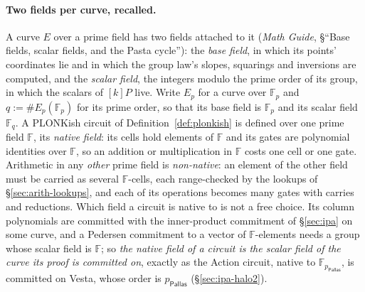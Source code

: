 \documentclass[11pt,a4paper]{article}
\theoremstyle{definition}
\newcommand{\F}{\mathbb{F}}
\newcommand{\Pallas}{\ensuremath{\mathsf{Pallas}}}
\begin{document}
\paragraph{Two fields per curve, recalled.}
A curve $E$ over a prime field has two fields attached to it
(\emph{Math Guide}, \S``Base fields, scalar fields, and the Pasta
cycle''): the \emph{base field}, in which its points' coordinates lie
and in which the group law's slopes, squarings and inversions are
computed, and the \emph{scalar field}, the integers modulo the prime
order of its group, in which the scalars of $[k]P$ live. Write $E_p$
for a curve over $\F_p$ and $q := \#E_p(\F_p)$ for its prime order, so
that its base field is $\F_p$ and its scalar field $\F_q$. A PLONKish
circuit of Definition~\ref{def:plonkish} is defined over one prime
field $\F$, its \emph{native field}: its cells hold elements of $\F$
and its gates are polynomial identities over $\F$, so an addition or
multiplication in $\F$ costs one cell or one gate. Arithmetic in any
\emph{other} prime field is \emph{non-native}: an element of the other
field must be carried as several $\F$-cells, each range-checked by the
lookups of \S\ref{sec:arith-lookups}, and each of its operations
becomes many gates with carries and reductions. Which field a
circuit is native to is not a free choice. Its column polynomials are
committed with the inner-product commitment of \S\ref{sec:ipa} on some
curve, and a Pedersen commitment to a vector of $\F$-elements needs a
group whose scalar field is $\F$; so \emph{the native field of a
circuit is the scalar field of the curve its proof is committed on},
exactly as the Action circuit, native to $\F_{p_{\Pallas}}$, is
committed on Vesta, whose order is $p_{\Pallas}$
(\S\ref{sec:ipa-halo2}).
\end{document}
